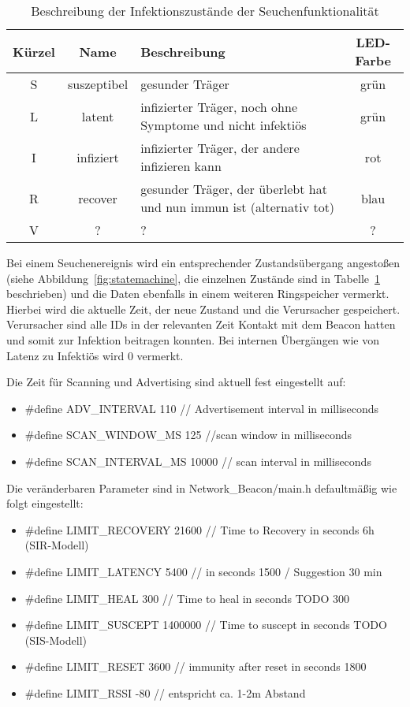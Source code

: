 \documentclass[11pt,ngerman]{scrartcl} %
\begin{document}
\begin{table}[h]
  \centering
  \begin{tabular}{ccp{7cm}c}
    Kürzel & Name & Beschreibung & LED-Farbe \\\hline
    S & suszeptibel & gesunder Träger & grün \\
    L & latent & infizierter Träger, noch ohne Symptome und nicht infektiös & grün \\
    I & infiziert & infizierter Träger, der andere infizieren kann & rot \\
    R & recover & gesunder Träger, der überlebt hat und nun immun ist (alternativ tot) & blau \\
    V & ? & ? & ? \\
  \end{tabular}
  \caption{Beschreibung der Infektionszustände der Seuchenfunktionalität}
  \label{tab:infectioninfo}
\end{table}

Bei einem Seuchenereignis wird ein entsprechender Zustandsübergang angestoßen (siehe Abbildung~\ref{fig:statemachine}, die einzelnen Zustände sind in Tabelle~\ref{tab:infectioninfo} beschrieben) und die Daten ebenfalls in einem weiteren Ringspeicher vermerkt. Hierbei wird die aktuelle Zeit, der neue Zustand und die Verursacher gespeichert. Verursacher sind alle IDs in der relevanten Zeit Kontakt mit dem Beacon hatten und somit zur Infektion beitragen konnten. Bei internen Übergängen wie von Latenz zu Infektiös wird 0 vermerkt.

Die Zeit für Scanning und Advertising sind aktuell fest eingestellt auf:
\begin{itemize}
\item \#define ADV\_INTERVAL				110 // Advertisement interval in milliseconds
\item \#define SCAN\_WINDOW\_MS				125  //scan window in milliseconds
\item \#define SCAN\_INTERVAL\_MS			10000  // scan interval in milliseconds
\end{itemize}


Die veränderbaren Parameter sind in Network\_Beacon/main.h defaultmäßig wie folgt eingestellt:
\begin{itemize}
\item \#define LIMIT\_RECOVERY				21600 // Time to Recovery in seconds     6h (SIR-Modell)
\item \#define LIMIT\_LATENCY				5400 //  in seconds 1500  / Suggestion 30 min
\item \#define LIMIT\_HEAL					300 // Time to heal in seconds TODO 300
\item \#define LIMIT\_SUSCEPT				1400000 // Time to suscept in seconds TODO (SIS-Modell)
\item \#define LIMIT\_RESET					3600 // immunity after reset in seconds 1800
\item \#define LIMIT\_RSSI		 			-80 // entspricht ca. 1-2m Abstand
\end{itemize}
\end{document}
